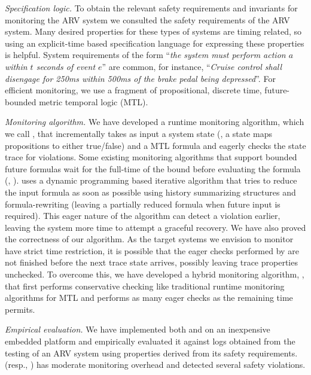 \noindent
\textit{Specification logic.}
To obtain the relevant safety requirements and invariants for monitoring the ARV system we consulted the safety requirements of the ARV system.
Many desired properties for these types of systems are timing related, so using an explicit-time based specification language for expressing these properties is helpful.
System requirements of the form ``\emph{the system must perform action $a$ within $t$ seconds of event $e$}'' are common, for instance, ``\emph{Cruise control shall disengage for 250ms within 500ms of the brake pedal being depressed}''.
%
For efficient monitoring, we use a fragment of propositional, discrete time, future-bounded metric temporal logic (MTL)\cite{Koymans1990}.

\noindent
\textit{Monitoring algorithm.}
We have developed a runtime monitoring algorithm, which we call \monitor, that incrementally takes as input a system state
(\ie, a state maps  propositions to either true/false) and a MTL formula and eagerly checks the state trace for violations.
Some existing monitoring algorithms that support bounded future formulas wait for the full-time of the bound before evaluating the formula (\eg, \cite{Basin2008}).
\monitor uses a dynamic programming based iterative algorithm that tries to reduce the input formula as soon as possible using history summarizing structures and formula-rewriting (leaving a partially reduced formula when future input is required).
This eager nature of the algorithm can detect a violation earlier, leaving the system more time to attempt a graceful recovery.
We have also proved the correctness of our algorithm. As the target systems we envision to monitor
have strict time restriction,
it is possible that the eager checks performed by \monitor are not finished before the next trace state arrives, possibly leaving trace properties unchecked.
To overcome this, we have developed a hybrid monitoring algorithm, \ha, that first performs conservative checking like traditional runtime monitoring algorithms for MTL and performs as many eager checks as the remaining time permits.

\noindent
\textit{Empirical evaluation.}
We have implemented both \monitor and \ha on an inexpensive embedded platform and empirically evaluated it against logs obtained from the testing of an ARV system using properties derived from its safety requirements.
\monitor (resp., \ha) has moderate monitoring overhead and detected several safety violations.


